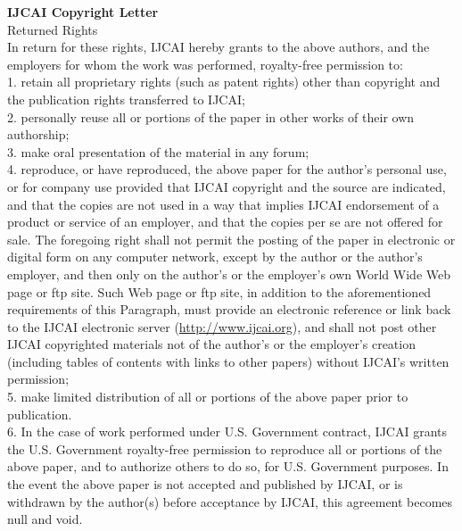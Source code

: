 \documentclass{uicthesi}
\begin{document}
\newpage
\noindent \textbf{IJCAI Copyright Letter}\\
Returned Rights\\
In return for these rights, IJCAI hereby grants to the above authors, and the employers for whom the work was performed, royalty-free permission to: \\
1. retain all proprietary rights (such as patent rights) other than copyright and the publication rights transferred to IJCAI;\\
2. personally reuse all or portions of the paper in other works of their own authorship;\\
3. make oral presentation of the material in any forum;\\
4. reproduce, or have reproduced, the above paper for the author’s personal use, or for company use provided that IJCAI copyright
and the source are indicated, and that the copies are not used in a way that implies IJCAI endorsement of a product or service of an
employer, and that the copies per se are not offered for sale. The foregoing right shall not permit the posting of the paper in electronic or digital form on any computer network, except by the author or the author’s employer, and then only on the author’s or the employer’s own World Wide Web page or ftp site. Such Web page or ftp site, in addition to the aforementioned requirements of this Paragraph,
must provide an electronic reference or link back to the IJCAI electronic server (\url{http://www.ijcai.org}), and shall not post other IJCAI
copyrighted materials not of the author’s or the employer’s creation (including tables of contents with links to other papers) without
IJCAI’s written permission;\\
5. make limited distribution of all or portions of the above paper prior to publication.\\
6. In the case of work performed under U.S. Government contract, IJCAI grants the U.S. Government royalty-free permission to reproduce all or portions of the above paper, and to authorize others to do so, for U.S. Government purposes. In the event the above paper is not
accepted and published by IJCAI, or is withdrawn by the author(s) before acceptance by IJCAI, this agreement becomes null and void.

\bibformb


\end{document}
